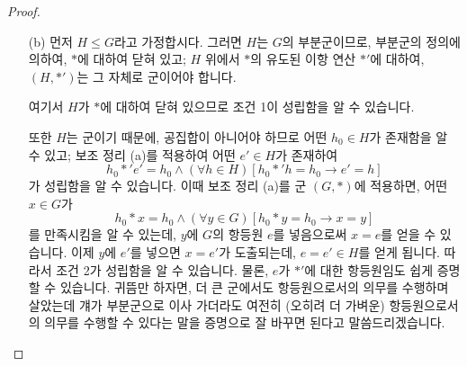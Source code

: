 \documentclass[12pt]{paper}
\begin{document}
\begin{proof}
\begin{itemize}
\begin{proof}[Proof of (a)]
        이제, (11)이 성립함을 보이겠습니다.
        아까와 비슷하게 $x := b * a^{-1}$로 두면,
        \begin{align*}
          x * a
          & = \left( b * a^{-1} \right) * a \\
          & = b * \left( a^{-1} * a \right) \\
          & = b * e \\
          & = b
        \end{align*}
        이고,
        $y * a = b$인 임의의 $y \in G$에 대하여,
        \begin{align*}
          x * a = b
          & \implies x * a = y * a \\
          & \implies \left( x * a \right) * a^{-1} = \left( y * a \right) * a^{-1} \\
          & \implies x * \left( a * a^{-1} \right) = y * \left( a * a^{-1} \right) \\
          & \implies x * e = y * e \\
          & \implies x = y
        \end{align*}
        이므로, (11)이 성립함을 알 수 있습니다.
      \end{proof}

      \item[(b)] 먼저 $H \leq G$라고 가정합시다.
      그러면 $H$는 $G$의 부분군이므로, 부분군의 정의에 의하여,
      $*$에 대하여 닫혀 있고;
      $H$ 위에서 $*$의 유도된 이항 연산 $*'$에 대하여, $\left( H , *' \right)$는 그 자체로 군이어야 합니다.

      여기서 $H$가 $*$에 대하여 닫혀 있으므로 조건 1이 성립함을 알 수 있습니다.
      
      또한 $H$는 군이기 때문에,
      공집합이 아니어야 하므로 어떤 $h_0 \in H$가 존재함을 알 수 있고;
      보조 정리 (a)를 적용하여 어떤 $e' \in H$가 존재하여 $$ h_0 *' e' = h_0 \land \left( \forall h \in H \right) \left[ h_0 *' h = h_0 \rightarrow e' = h \right] $$가 성립함을 알 수 있습니다.
      이때 보조 정리 (a)를 군 $ \left( G , * \right) $에 적용하면, 어떤 $x \in G$가 $$ h_0 * x = h_0 \land \left( \forall y \in G \right) \left[ h_0 * y = h_0 \rightarrow x = y \right] $$를 만족시킴을 알 수 있는데,
      $y$에 $G$의 항등원 $e$를 넣음으로써 $x = e$를 얻을 수 있습니다.
      이제 $y$에 $e'$를 넣으면 $x = e'$가 도출되는데, $e = e' \in H$를 얻게 됩니다.
      따라서 조건 2가 성립함을 알 수 있습니다.
      물론, $e$가 $*'$에 대한 항등원임도 쉽게 증명할 수 있습니다.
      귀뜸만 하자면, 더 큰 군에서도 항등원으로서의 의무를 수행하며 살았는데 걔가 부분군으로 이사 가더라도 여전히 (오히려 더 가벼운) 항등원으로서의 의무를 수행할 수 있다는 말을 증명으로 잘 바꾸면 된다고 말씀드리겠습니다.


\end{itemize}
\end{proof}
\end{document}
